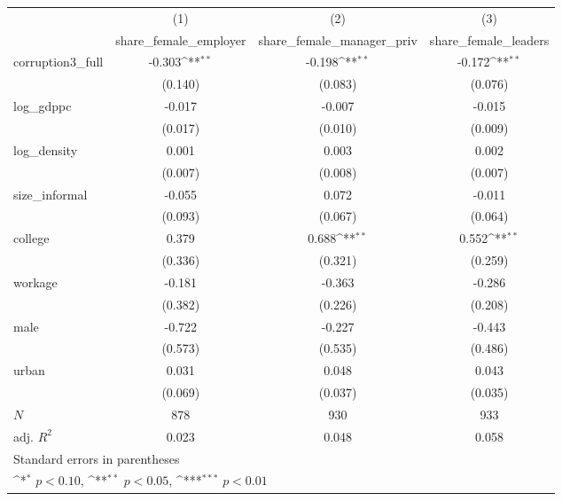 {
\def\sym#1{\ifmmode^{#1}\else\(^{#1}\)\fi}
\begin{tabular}{l*{3}{c}}
\hline\hline
            &\multicolumn{1}{c}{(1)}&\multicolumn{1}{c}{(2)}&\multicolumn{1}{c}{(3)}\\
            &\multicolumn{1}{c}{share\_female\_employer}&\multicolumn{1}{c}{share\_female\_manager\_priv}&\multicolumn{1}{c}{share\_female\_leaders}\\
\hline
corruption3\_full&      -0.303\sym{**} &      -0.198\sym{**} &      -0.172\sym{**} \\
            &     (0.140)         &     (0.083)         &     (0.076)         \\
[1em]
log\_gdppc   &      -0.017         &      -0.007         &      -0.015         \\
            &     (0.017)         &     (0.010)         &     (0.009)         \\
[1em]
log\_density &       0.001         &       0.003         &       0.002         \\
            &     (0.007)         &     (0.008)         &     (0.007)         \\
[1em]
size\_informal&      -0.055         &       0.072         &      -0.011         \\
            &     (0.093)         &     (0.067)         &     (0.064)         \\
[1em]
college     &       0.379         &       0.688\sym{**} &       0.552\sym{**} \\
            &     (0.336)         &     (0.321)         &     (0.259)         \\
[1em]
workage     &      -0.181         &      -0.363         &      -0.286         \\
            &     (0.382)         &     (0.226)         &     (0.208)         \\
[1em]
male        &      -0.722         &      -0.227         &      -0.443         \\
            &     (0.573)         &     (0.535)         &     (0.486)         \\
[1em]
urban       &       0.031         &       0.048         &       0.043         \\
            &     (0.069)         &     (0.037)         &     (0.035)         \\
\hline
\(N\)       &         878         &         930         &         933         \\
adj. \(R^{2}\)&       0.023         &       0.048         &       0.058         \\
\hline\hline
\multicolumn{4}{l}{\footnotesize Standard errors in parentheses}\\
\multicolumn{4}{l}{\footnotesize \sym{*} \(p<0.10\), \sym{**} \(p<0.05\), \sym{***} \(p<0.01\)}\\
\end{tabular}
}

